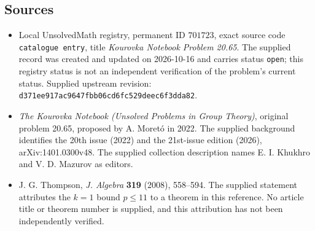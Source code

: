 \documentclass[11pt]{article}
\begin{document}
\subsection{Sources}
\begin{itemize}
\item Local UnsolvedMath registry, permanent ID \(701723\), exact source code \texttt{catalogue entry}, title \emph{Kourovka Notebook Problem 20.65}. The supplied record was created and updated on 2026-10-16 and carries status \texttt{open}; this registry status is not an independent verification of the problem's current status. Supplied upstream revision: \texttt{d371ee917ac9647fbb06cd6fc529deec6f3dda82}.
\item \emph{The Kourovka Notebook (Unsolved Problems in Group Theory)}, original problem 20.65, proposed by A. Moret\'{o} in 2022. The supplied background identifies the 20th issue (2022) and the 21st-issue edition (2026), arXiv:1401.0300v48. The supplied collection description names E. I. Khukhro and V. D. Mazurov as editors.
\item J. G. Thompson, \emph{J. Algebra} \textbf{319} (2008), 558--594. The supplied statement attributes the \(k=1\) bound \(p\leq 11\) to a theorem in this reference. No article title or theorem number is supplied, and this attribution has not been independently verified.
\end{itemize}
\end{document}
